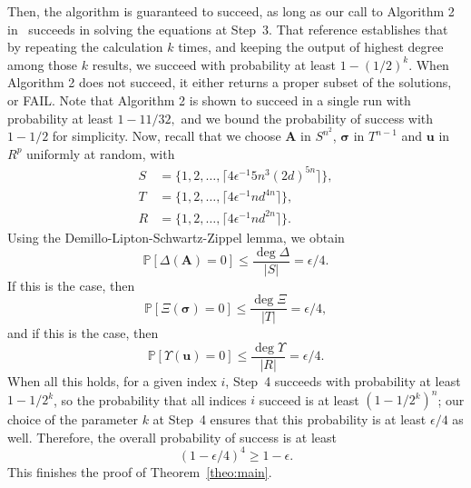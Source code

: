 \documentclass[12pt]{article}
\def\mA{{\bm A}}
\def\ub{{\bm u}}
\def\pr{\mathbb{P}}
\begin{document}
Then, the algorithm is guaranteed to succeed, as long as our call to
Algorithm 2 in~\cite{SH} succeeds in solving the equations at
Step~3. That reference establishes that by repeating the calculation
$k$ times, and keeping the output of highest degree among those $k$
results, we succeed with probability at least $1-(1/2)^k$. When
Algorithm 2 does not succeed, it either returns a proper subset of the
solutions, or FAIL. Note that Algorithm 2 is shown to succeed in a
single run with probability at least $1-11/32,$ and we bound the
probability of success with $1-1/2$ for simplicity.  Now, 
recall that we choose
 $\mA$ in $S^{n^2}$, $\bm \sigma$ in $T^{n-1}$ and $\ub$ in $R^{p}$ 
uniformly at random, with
\begin{align*}
S &= \{1,2,\hdots,\lceil 4\epsilon^{-1}5n^3(2d)^{5n}\rceil \},\\
T &= \{1,2,\hdots,\lceil 4\epsilon^{-1}nd^{4n} \rceil \},\\
R &= \{1,2,\hdots,\lceil 4\epsilon^{-1}nd^{2n} \rceil \}.
\end{align*}
Using the Demillo-Lipton-Schwartz-Zippel lemma, we obtain
\[
\pr[\Delta(\mA)=0] \leq  \frac{\deg\Delta}{|S|} = \epsilon/4.
\]
If this is the case, then 
\[
\pr[\Xi(\bm \sigma)=0] \leq  \frac{\deg\Xi}{|T|} = \epsilon/4,
\]
and if this is the case, then
\[
\pr[\Upsilon(\ub)=0] \leq  \frac{\deg\Upsilon}{|R|} = \epsilon/4.
\]
When all this holds, for a given index $i$, Step~4 succeeds with
probability at least $1-1/2^k$, so the probability that all indices
$i$ succeed is at least $(1-1/2^k)^n$; our choice of the parameter $k$
at Step~4 ensures that this probability is at least $\epsilon/4$ as
well. Therefore, the overall probability of success is
at least
\[(1-\epsilon/4)^4 \ge 1-\epsilon.\]
This finishes the proof of Theorem~\ref{theo:main}.



\end{document}
